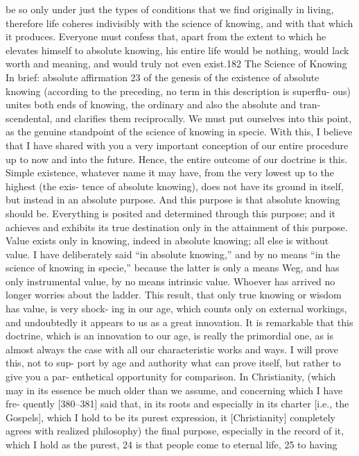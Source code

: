 be so only under just the types of conditions that we find originally in living,
therefore life coheres indivisibly with the science of knowing, and with that
which it produces. Everyone must confess that, apart from the extent to which
he elevates himself to absolute knowing, his entire life would be nothing,
would lack worth and meaning, and would truly not even exist.182
The Science of Knowing
In brief: absolute affirmation 23 of the genesis of the existence of absolute
knowing (according to the preceding, no term in this description is superflu-
ous) unites both ends of knowing, the ordinary and also the absolute and tran-
scendental, and clarifies them reciprocally. We must put ourselves into this
point, as the genuine standpoint of the science of knowing in specie. With this,
I believe that I have shared with you a very important conception of our entire
procedure up to now and into the future.
Hence, the entire outcome of our doctrine is this. Simple existence,
whatever name it may have, from the very lowest up to the highest (the exis-
tence of absolute knowing), does not have its ground in itself, but instead in
an absolute purpose. And this purpose is that absolute knowing should be.
Everything is posited and determined through this purpose; and it achieves
and exhibits its true destination only in the attainment of this purpose. Value
exists only in knowing, indeed in absolute knowing; all else is without value. I
have deliberately said “in absolute knowing,” and by no means “in the science
of knowing in specie,” because the latter is only a means {Weg}, and has only
instrumental value, by no means intrinsic value. Whoever has arrived no
longer worries about the ladder.
This result, that only true knowing or wisdom has value, is very shock-
ing in our age, which counts only on external workings, and undoubtedly it
appears to us as a great innovation. It is remarkable that this doctrine, which
is an innovation to our age, is really the primordial one, as is almost always the
case with all our characteristic works and ways. I will prove this, not to sup-
port by age and authority what can prove itself, but rather to give you a par-
enthetical opportunity for comparison. In Christianity, (which may in its
essence be much older than we assume, and concerning which I have fre-
quently [380–381] said that, in its roots and especially in its charter [i.e., the
Gospels], which I hold to be its purest expression, it [Christianity] completely
agrees with realized philosophy) the final purpose, especially in the record of
it, which I hold as the purest, 24 is that people come to eternal life, 25 to having
